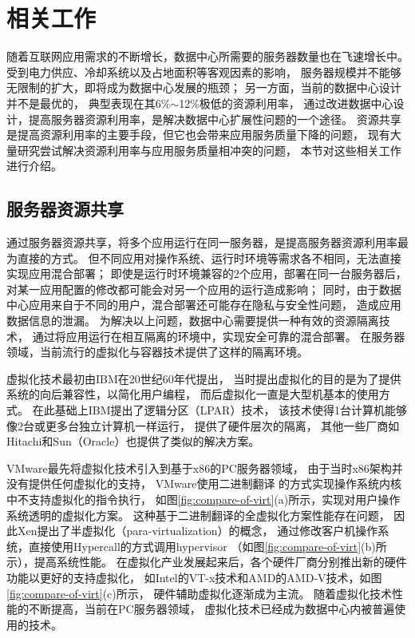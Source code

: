 

\chapter{相关工作}
\label{chap:background}

随着互联网应用需求的不断增长，数据中心所需要的服务器数量也在飞速增长中。
受到电力供应、冷却系统以及占地面积等客观因素的影响，
服务器规模并不能够无限制的扩大，即将成为数据中心发展的瓶颈；
另一方面，当前的数据中心设计并不是最优的，
典型表现在其6\%$\sim$12\%极低的资源利用率，
通过改进数据中心设计，提高服务器资源利用率，是解决数据中心扩展性问题的一个途径。
资源共享是提高资源利用率的主要手段，但它也会带来应用服务质量下降的问题，
现有大量研究尝试解决资源利用率与应用服务质量相冲突的问题，
本节对这些相关工作进行介绍。

\section{服务器资源共享}

通过服务器资源共享，将多个应用运行在同一服务器，是提高服务器资源利用率最为直接的方式。
但不同应用对操作系统、运行时环境等需求各不相同，无法直接实现应用混合部署；
即使是运行时环境兼容的2个应用，部署在同一台服务器后，
对某一应用配置的修改都可能会对另一个应用的运行造成影响；
同时，由于数据中心应用来自于不同的用户，混合部署还可能存在隐私与安全性问题，
造成应用数据信息的泄漏。
为解决以上问题，数据中心需要提供一种有效的资源隔离技术，
通过将应用运行在相互隔离的环境中，实现安全可靠的混合部署。
在服务器领域，当前流行的虚拟化与容器技术提供了这样的隔离环境。

虚拟化技术最初由IBM在20世纪60年代提出，
当时提出虚拟化的目的是为了提供系统的向后兼容性，以简化用户编程，
而后虚拟化一直是大型机基本的使用方式。
在此基础上IBM提出了逻辑分区（LPAR）\cite{IBM_LPAR:2007}技术，
该技术使得1台计算机能够像2台或更多台独立计算机一样运行，
提供了硬件层次的隔离，
其他一些厂商如Hitachi\cite{hitachi-lpar}和Sun（Oracle）\cite{LDom}也提供了类似的解决方案。

VMware最先将虚拟化技术引入到基于x86的PC服务器领域，
由于当时x86架构并没有提供任何虚拟化的支持，
VMware使用二进制翻译\cite{vmware-compare-hw-sw:2006}
的方式实现操作系统内核中不支持虚拟化的指令执行，
如图\ref{fig:compare-of-virt}(a)所示，实现对用户操作系统透明的虚拟化方案。
这种基于二进制翻译的全虚拟化方案性能存在问题，
因此Xen提出了半虚拟化（para-virtualization）\cite{barham_xen_2003}的概念，
通过修改客户机操作系统，直接使用Hypercall的方式调用hypervisor
（如图\ref{fig:compare-of-virt}(b)所示），提高系统性能。
在虚拟化产业发展起来后，各个硬件厂商分别推出新的硬件功能以更好的支持虚拟化，
如Intel的VT-x技术和AMD的AMD-V技术，如图\ref{fig:compare-of-virt}(c)所示，
硬件辅助虚拟化逐渐成为主流。
随着虚拟化技术性能的不断提高，当前在PC服务器领域，
虚拟化技术已经成为数据中心内被普遍使用的技术。

